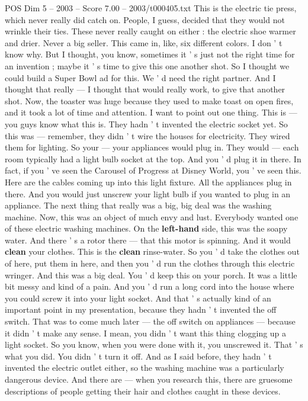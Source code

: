 \begin{textsample}{POS Dim 5 – 2003 – Score 7.00 – 2003/t000405.txt}
This is the electric tie press, which never really did catch on.
People, I guess, decided that they would not wrinkle their ties.
These never really caught on either : the electric shoe warmer and drier.
Never a big seller.
This came in, like, six different colors.
I don ' t know why.
But I thought, you know, sometimes it ' s just not the right time for an invention ; maybe it ' s time to give this one another shot.
So I thought we could build a Super Bowl ad for this.
We ' d need the right partner.
And I thought that really — I thought that would really work, to give that another shot.
Now, the toaster was huge because they used to make toast on open fires, and it took a lot of time and attention.
I want to point out one thing.
This is — you guys know what this is.
They hadn ' t invented the electric socket yet.
So this was — remember, they didn ' t wire the houses for electricity.
They wired them for lighting.
So your — your appliances would plug in.
They would — each room typically had a light bulb socket at the top.
And you ' d plug it in there.
In fact, if you ' ve seen the Carousel of Progress at Disney World, you ' ve seen this.
Here are the cables coming up into this light fixture.
All the appliances plug in there.
And you would just unscrew your light bulb if you wanted to plug in an appliance.
The next thing that really was a big, big deal was the washing machine.
Now, this was an object of much envy and lust.
Everybody wanted one of these electric washing machines.
On the \textbf{left-hand} side, this was the soapy water.
And there ' s a rotor there — that this motor is spinning.
And it would \textbf{clean} your clothes.
This is the \textbf{clean} rinse-water.
So you ' d take the clothes out of here, put them in here, and then you ' d run the clothes through this electric wringer.
And this was a big deal.
You ' d keep this on your porch.
It was a little bit messy and kind of a pain.
And you ' d run a long cord into the house where you could screw it into your light socket.
And that ' s actually kind of an important point in my presentation, because they hadn ' t invented the off switch.
That was to come much later — the off switch on appliances — because it didn ' t make any sense.
I mean, you didn ' t want this thing clogging up a light socket.
So you know, when you were done with it, you unscrewed it.
That ' s what you did.
You didn ' t turn it off.
And as I said before, they hadn ' t invented the electric outlet either, so the washing machine was a particularly dangerous device.
And there are — when you research this, there are gruesome descriptions of people getting their hair and clothes caught in these devices.

\end{textsample}
